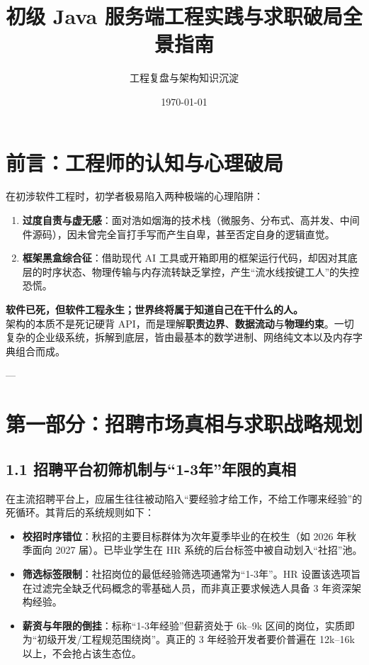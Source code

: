 \documentclass[11pt,a4paper]{ctexart}
\title{\textbf{初级 Java 服务端工程实践与求职破局全景指南}}
\author{工程复盘与架构知识沉淀}
\date{\today}
\begin{document}
\maketitle
\tableofcontents
\newpage

\section{前言：工程师的认知与心理破局}

在初涉软件工程时，初学者极易陷入两种极端的心理陷阱：
\begin{enumerate}[label=\arabic*.]
    \item \textbf{过度自责与虚无感}：面对浩如烟海的技术栈（微服务、分布式、高并发、中间件源码），因未曾完全盲打手写而产生自卑，甚至否定自身的逻辑直觉。
    \item \textbf{框架黑盒综合征}：借助现代 AI 工具或开箱即用的框架运行代码，却因对其底层的时序状态、物理传输与内存流转缺乏掌控，产生“流水线按键工人”的失控恐慌。
\end{enumerate}

\begin{tcolorbox}[colback=blue!5!white,colframe=boxborder,title=\textbf{核心心法}]
\textbf{软件已死，但软件工程永生；世界终将属于知道自己在干什么的人。}\\
架构的本质不是死记硬背 API，而是理解\textbf{职责边界}、\textbf{数据流动}与\textbf{物理约束}。一切复杂的企业级系统，拆解到底层，皆由最基本的数学进制、网络纯文本以及内存字典组合而成。
\end{tcolorbox}

---

\section{第一部分：招聘市场真相与求职战略规划}

\subsection{1.1 招聘平台初筛机制与“1-3年”年限的真相}
在主流招聘平台上，应届生往往被动陷入“要经验才给工作，不给工作哪来经验”的死循环。其背后的系统规则如下：
\begin{itemize}
    \item \textbf{校招时序错位}：秋招的主要目标群体为次年夏季毕业的在校生（如 2026 年秋季面向 2027 届）。已毕业学生在 HR 系统的后台标签中被自动划入“社招”池。
    \item \textbf{筛选标签限制}：社招岗位的最低经验筛选项通常为“1-3年”。HR 设置该选项旨在过滤完全缺乏代码概念的零基础人员，而非真正要求候选人具备 3 年资深架构经验。
    \item \textbf{薪资与年限的倒挂}：标称“1-3年经验”但薪资处于 6k--9k 区间的岗位，实质即为“初级开发/工程规范围绕岗”。真正的 3 年经验开发者要价普遍在 12k--16k 以上，不会抢占该生态位。
\end{itemize}
\end{document}
